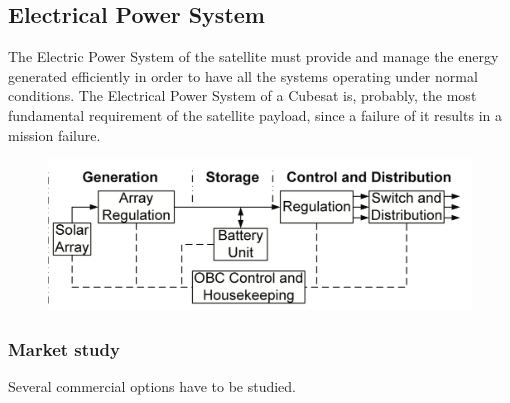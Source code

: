 \subsection{Electrical Power System}

The Electric Power System of the satellite must provide and manage the energy generated efficiently in order to have all the systems operating under normal conditions. The Electrical Power System of a Cubesat is, probably, the most fundamental requirement of the satellite payload, since a failure of it results in a mission failure.

\begin{figure}[hp]
\includegraphics[scale=0.5]{./sections/SatelliteDesign/images/EPSschematics}
\centering

\end{figure}

\subsubsection{Market study}
Several commercial options have to be studied.
